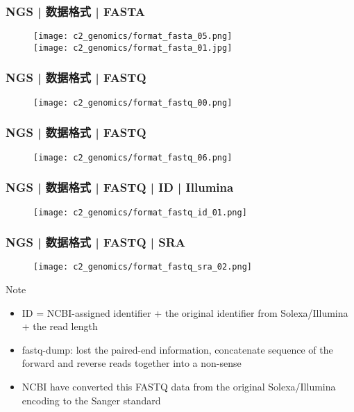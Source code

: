 \begin{frame}
  \frametitle{NGS | 数据格式 | \alert{FASTA}}
  \begin{figure}
    \centering
    \texttt{[image: c2\_genomics/format\_fasta\_05.png]}\\
    \vspace{1em}
    \texttt{[image: c2\_genomics/format\_fasta\_01.jpg]}
  \end{figure}
\end{frame}

\begin{frame}
  \frametitle{NGS | 数据格式 | \alert{FASTQ}}
  \begin{figure}
    \centering
    \texttt{[image: c2\_genomics/format\_fastq\_00.png]}
  \end{figure}
\end{frame}

\begin{frame}
  \frametitle{NGS | 数据格式 | \alert{FASTQ}}
  \begin{figure}
    \centering
    \texttt{[image: c2\_genomics/format\_fastq\_06.png]}
  \end{figure}
\end{frame}

\begin{frame}
  \frametitle{NGS | 数据格式 | FASTQ | ID | Illumina}
  \begin{figure}
    \centering
    \texttt{[image: c2\_genomics/format\_fastq\_id\_01.png]}
  \end{figure}
\end{frame}

\begin{frame}
  \frametitle{NGS | 数据格式 | FASTQ | SRA}
  \begin{figure}
    \centering
    \texttt{[image: c2\_genomics/format\_fastq\_sra\_02.png]}
  \end{figure}
  \begin{block}{Note}
    \begin{itemize}
      \item ID = NCBI-assigned identifier + the original identifier from Solexa/Illumina + the read length
      \item \alert{fastq-dump}: lost the paired-end information, concatenate sequence of the forward and reverse reads together into a non-sense
      \item NCBI have converted this FASTQ data from the original Solexa/Illumina encoding to the \alert{Sanger standard}
    \end{itemize}
  \end{block}
\end{frame}

